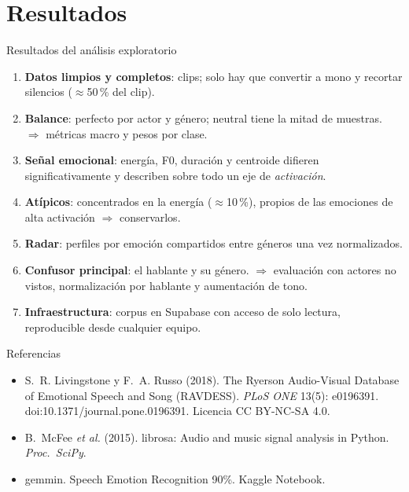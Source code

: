 \documentclass[aspectratio=169,11pt]{beamer}
\begin{document}
\section{Resultados}
\begin{frame}{Resultados del análisis exploratorio}
  \footnotesize
  \begin{enumerate}
    \item \textbf{Datos limpios y completos}: \nClips{} clips; solo hay que convertir a mono y recortar
          silencios ($\approx$50\,\% del clip).
    \item \textbf{Balance}: perfecto por actor y género; neutral tiene la mitad de muestras.
          $\Rightarrow$ métricas macro y pesos por clase.
    \item \textbf{Señal emocional}: energía, F0, duración y centroide difieren significativamente y
          describen sobre todo un eje de \emph{activación}.
    \item \textbf{Atípicos}: concentrados en la energía ($\approx$10\,\%), propios de las emociones de alta
          activación $\Rightarrow$ conservarlos.
    \item \textbf{Radar}: perfiles por emoción compartidos entre géneros una vez normalizados.
    \item \textbf{Confusor principal}: el hablante y su género.
          $\Rightarrow$ evaluación con actores no vistos, normalización por hablante y aumentación de
          tono.
    \item \textbf{Infraestructura}: corpus en Supabase con acceso de solo lectura, reproducible desde
          cualquier equipo.
  \end{enumerate}
\end{frame}

\begin{frame}{Referencias}
  \footnotesize
  \begin{itemize}
    \item S.~R. Livingstone y F.~A. Russo (2018). The Ryerson Audio-Visual Database of Emotional Speech
          and Song (RAVDESS). \emph{PLoS ONE} 13(5): e0196391. doi:10.1371/journal.pone.0196391.
          Licencia CC BY-NC-SA 4.0.
    \item B.~McFee \emph{et al.} (2015). librosa: Audio and music signal analysis in Python.
          \emph{Proc.\ SciPy}.
    \item gemmin. Speech Emotion Recognition 90\%. Kaggle Notebook.
  \end{itemize}
\end{frame}
\end{document}

